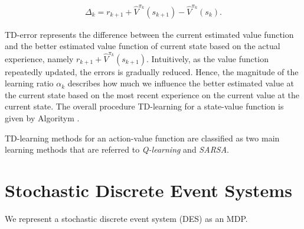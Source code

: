 \begin{align}
  \Delta_k = r_{k+1} + \hat{V}^{\pi_k}(s_{k+1}) - \hat{V}^{\pi_k}(s_k).
\end{align}

TD-error represents the difference between the current estimated value function and the better estimated value function of current state based on the actual experience, namely $r_{k+1} + \hat{V}^{\pi_k}(s_{k+1})$. Intuitively, as the value function repeatedly updated, the errors is gradually reduced. Hence, the magnitude of the learning ratio $\alpha_k$ describes how much we influence the better estimated value at the current state based on the most recent experience on the current value at the current state. The overall procedure TD-learning for a state-value function is given by Algoritym .

TD-learning methods for an action-value function are classified as two main learning methods that are referred to {\it Q-learning} and {\it SARSA}.



\section{Stochastic Discrete Event Systems}
We represent a stochastic discrete event system (DES) as an MDP.

